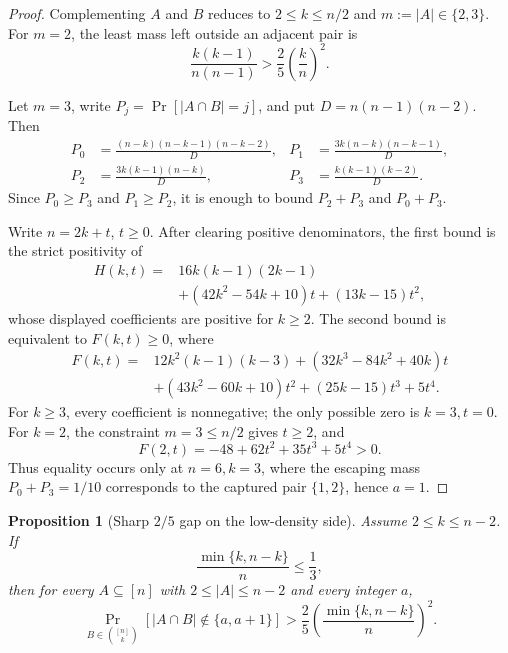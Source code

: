 \documentclass[11pt]{article}
\newtheorem{proposition}[theorem]{Proposition}
\theoremstyle{definition}
\theoremstyle{remark}
\newcommand{\1}{\mathbf 1}
\begin{document}
\begin{proof}
Complementing \(A\) and \(B\) reduces to
\(2\le k\le n/2\) and \(m:=|A|\in\{2,3\}\).
For \(m=2\), the least mass left outside an adjacent pair is
\[
 \frac{k(k-1)}{n(n-1)}
 >\frac25\left(\frac kn\right)^2.
\]

Let \(m=3\), write \(P_j=\Pr[|A\cap B|=j]\), and put
\(D=n(n-1)(n-2)\).  Then
\[
\begin{aligned}
 P_0&=\frac{(n-k)(n-k-1)(n-k-2)}D,&
 P_1&=\frac{3k(n-k)(n-k-1)}D,\\
 P_2&=\frac{3k(k-1)(n-k)}D,&
 P_3&=\frac{k(k-1)(k-2)}D.
\end{aligned}
\]
Since \(P_0\ge P_3\) and \(P_1\ge P_2\), it is enough to bound
\(P_2+P_3\) and \(P_0+P_3\).

Write \(n=2k+t\), \(t\ge0\).  After clearing positive denominators, the first
bound is the strict positivity of
\[
\begin{aligned}
 H(k,t)={}&16k(k-1)(2k-1)\\
 &+(42k^2-54k+10)t+(13k-15)t^2,
\end{aligned}
\]
whose displayed coefficients are positive for \(k\ge2\).
The second bound is equivalent to \(F(k,t)\ge0\), where
\[
\begin{aligned}
 F(k,t)={}&12k^2(k-1)(k-3)
 +(32k^3-84k^2+40k)t\\
 &+(43k^2-60k+10)t^2+(25k-15)t^3+5t^4.
\end{aligned}
\]
For \(k\ge3\), every coefficient is nonnegative; the only possible zero is
\(k=3,t=0\).  For \(k=2\), the constraint \(m=3\le n/2\) gives \(t\ge2\),
and
\[
 F(2,t)=-48+62t^2+35t^3+5t^4>0.
\]
Thus equality occurs only at \(n=6,k=3\), where the escaping mass
\(P_0+P_3=1/10\) corresponds to the captured pair \(\{1,2\}\), hence \(a=1\).
\end{proof}




\begin{proposition}[Sharp \(2/5\) gap on the low-density side]
\label{prop:sharp-low-density-gap}
Assume \(2\le k\le n-2\).
If
\[
 \frac{\min\{k,n-k\}}n\le\frac13,
\]
then for every \(A\subseteq[n]\) with \(2\le|A|\le n-2\) and every integer \(a\),
\[
 \Pr_{B\in\binom{[n]}k}[|A\cap B|\notin\{a,a+1\}]
 >
 \frac25\left(\frac{\min\{k,n-k\}}n\right)^2.
\]
\end{proposition}
\end{document}
